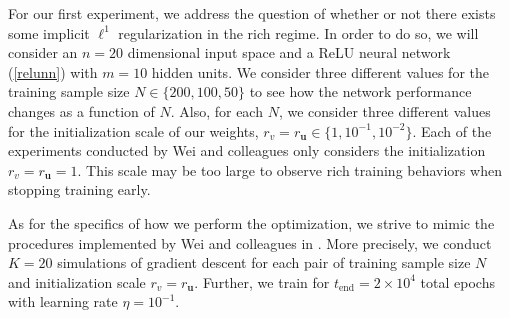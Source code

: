 \documentclass{article}
\begin{document}
For our first experiment, we address the question of whether or not there exists some implicit $\ell^1$ regularization in the rich regime. In order to do so, we will consider an $n=20$ dimensional input space and a ReLU neural network (\ref{relunn}) with $m=10$ hidden units. We consider three different values for the training sample size $N \in \{200, 100, 50\}$ to see how the network performance changes as a function of $N$. Also, for each $N$, we consider three different values for the initialization scale of our weights, $r_v = r_{\boldsymbol{u}} \in \{1, 10^{-1}, 10^{-2}\}$. Each of the experiments conducted by Wei and colleagues only considers the initialization $r_v = r_{\boldsymbol{u}} = 1$. This scale may be too large to observe rich training behaviors when stopping training early.

As for the specifics of how we perform the optimization, we strive to mimic the procedures implemented by Wei and colleagues in \cite{wei2019regularization}. More precisely, we conduct $K=20$ simulations of gradient descent for each pair of training sample size $N$ and initialization scale $r_v = r_{\boldsymbol{u}}$. Further, we train for $t_{\text{end}} = 2\times 10^4$ total epochs with learning rate $\eta = 10^{-1}$.
\end{document}
